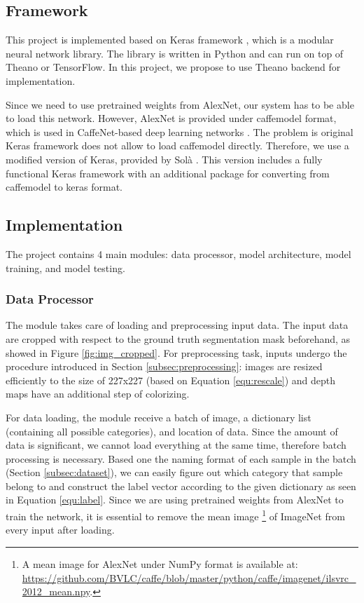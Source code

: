 

\subsection{Framework}
This project is implemented based on Keras framework \cite{Chollet2015_keras}, which is a modular neural network library. The library is written in Python and can run on top of Theano or TensorFlow. In this project, we propose to use Theano backend \cite{theano2016} for implementation.

Since we need to use pretrained weights from AlexNet, our system has to be able to load this network. However, AlexNet is provided under caffemodel format, which is used in CaffeNet-based deep learning networks \cite{Jia2014_caffe}. The problem is original Keras framework does not allow to load caffemodel directly. Therefore, we use a modified version of Keras, provided by Sol\`{a} \cite{Sola2016}. This version includes a fully functional Keras framework with an additional package for converting from caffemodel to keras format.



\subsection{Implementation}
The project contains 4 main modules: data processor, model architecture, model training, and model testing.

\subsubsection{Data Processor}
The module takes care of loading and preprocessing input data. The input data are cropped with respect to the ground truth segmentation mask beforehand, as showed in Figure \ref{fig:img_cropped}. For preprocessing task, inputs undergo the procedure introduced in Section \ref{subsec:preprocessing}: images are resized efficiently to the size of 227x227 (based on Equation \ref{equ:rescale}) and depth maps have an additional step of colorizing. 

For data loading, the module receive a batch of image, a dictionary list (containing all possible categories), and location of data. Since the amount of data is significant, we cannot load everything at the same time, therefore batch processing is necessary. Based one the naming format of each sample in the batch (Section \ref{subsec:dataset}), we can easily figure out which category that sample belong to and construct the label vector according to the given dictionary
as seen in Equation \ref{equ:label}. Since we are using pretrained weights from AlexNet to train the network, it is essential to remove the mean image \footnote{A mean image for AlexNet under NumPy format is available at: \url{https://github.com/BVLC/caffe/blob/master/python/caffe/imagenet/ilsvrc_2012_mean.npy}.} of ImageNet from every input after loading.

